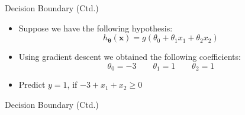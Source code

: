 \begin{frame}{Decision Boundary (Ctd.)}{}
	\begin{itemize}
		\item Suppose we have the following hypothesis:
		\begin{equation*}
			h_{\bm{\theta}}(\bm{x}) = g(\theta_0 + \theta_1 x_1 + \theta_2 x_2)
		\end{equation*}
		\item Using gradient descent we obtained the following coefficients:
		\begin{equation*}
			\theta_0 = -3 \qquad \theta_1 = 1 \qquad \theta_2 = 1
		\end{equation*}
		\item Predict $y = 1$, if $-3 + x_1 + x_2 \ge 0$
	\end{itemize}
\end{frame}


\begin{frame}{Decision Boundary (Ctd.)}{}
\end{frame}


